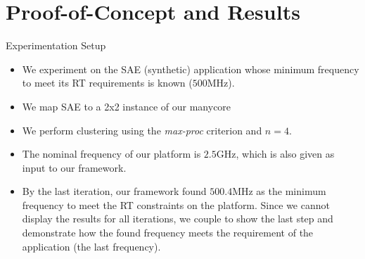 \section{Proof-of-Concept and Results}

\begin{frame}{Experimentation Setup}
  
  \begin{itemize}
  	\item We experiment on the SAE (synthetic) application whose minimum frequency to meet its RT requirements is known ($500$MHz).
  	\item We map SAE to a 2x2 instance of our manycore
	\item We perform clustering using the \textit{max-proc} criterion and $n = 4$.
	\item The nominal frequency of our platform is $2.5$GHz, which is also given as input to our framework. 
	\item By the last iteration, our framework found $500.4$MHz as the minimum frequency to meet the RT constraints on the platform. Since we cannot display the results for all iterations, we couple to show the last step and demonstrate how the found frequency meets the requirement of the application (the last frequency).
  \end{itemize}
  
\end{frame}

